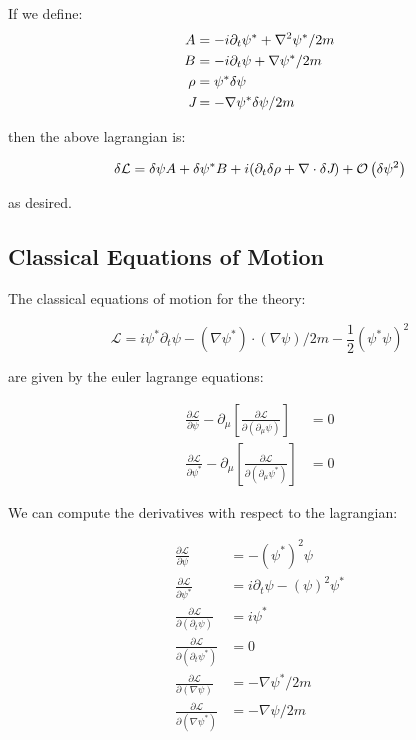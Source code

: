 \documentclass{article}
\newcommand{\Lagr}[0]{\mathcal{L}}
\newcommand{\order}[1]{\mathcal{O}\left( #1 \right)}
\newcommand{\J}[0]{\emph{J}}
\begin{document}
If we define:
\begin{align*}
A & = - i \partial_t \psi^* + \nabla^2 \psi^* / 2m \\
B & = - i \partial_t \psi + \nabla \psi^* / 2m\\
\rho & = \psi^* \delta \psi\\
\J & = - \nabla \psi^* \delta \psi / 2 m 
\end{align*}

then the above lagrangian is:

\[ \delta \Lagr = \delta \psi A + \delta \psi^* B 
	+ i ( \partial_t \delta \rho + \nabla \cdot \delta \J)
	+ \order{ \delta \psi^2 } \]

as desired.

\subsection{Classical Equations of Motion}

The classical equations of motion for the theory:

\[ \Lagr  = i \psi^* \partial_t \psi
- ( \nabla \psi^* ) \cdot (\nabla \psi) / 2 m
- \frac{1}{2} (\psi^* \psi)^2 \]

are given by the euler lagrange equations:

\begin{align*}
\frac{\partial \Lagr}{\partial \psi} 
	- \partial_\mu \left[ \frac{\partial \Lagr}{\partial(\partial_\mu \psi)} \right]
	& = 0\\
\frac{\partial \Lagr}{\partial \psi^*} 
	- \partial_\mu \left[ \frac{\partial \Lagr}{\partial(\partial_\mu \psi^*)} \right]
	& = 0
\end{align*}

We can compute the derivatives with respect to the lagrangian:

\begin{align*}
\frac{\partial \Lagr}{\partial \psi} & = - (\psi^*)^2 \psi\\
\frac{\partial \Lagr}{\partial \psi^*} & = i \partial_t \psi - (\psi)^2 \psi^*\\
\frac{\partial \Lagr}{\partial(\partial_t \psi)} & = i \psi^*\\
\frac{\partial \Lagr}{\partial(\partial_t \psi^*)} & = 0\\
\frac{\partial \Lagr}{\partial(\nabla \psi)} & = - \nabla \psi^* / 2m \\
\frac{\partial \Lagr}{\partial(\nabla \psi^*)} & = - \nabla \psi / 2m \\
\end{align*}
\end{document}
